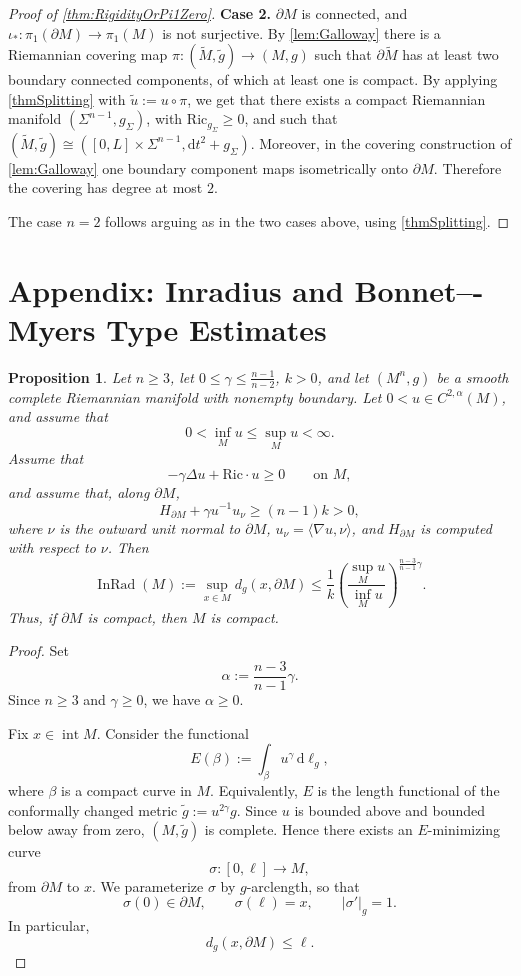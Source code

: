 \documentclass[12pt,a4paper,reqno]{amsart}
\newtheorem{proposition}{Proposition}
\theoremstyle{definition}
\renewcommand{\leq}{\leqslant}
\renewcommand{\geq}{\geqslant}
\renewcommand{\tilde}{\widetilde}
\begin{document}
{\begin{proof}[Proof of \cref{thm:RigidityOrPi1Zero}]
    \textbf{Case 2.} $\partial M$ is connected, and $\iota_*:\pi_1(\partial M)\to\pi_1(M)$ is not surjective. By \cref{lem:Galloway} there is a Riemannian covering map $\pi:(\tilde M,\tilde g)\to (M,g)$ such that $\partial\tilde M$ has at least two boundary connected components, of which at least one is compact. By applying \cref{thmSplitting} with $\tilde u:=u\circ\pi$, we get that there exists a compact Riemannian manifold $(\Sigma^{n-1},g_\Sigma)$, with $\mathrm{Ric}_{g_\Sigma}\geq 0$, and such that $(\tilde M,\tilde g)\cong ([0,L]\times\Sigma^{n-1},\mathrm{d}t^2+g_{\Sigma})$. Moreover, in the covering construction of \cref{lem:Galloway} one boundary component maps
isometrically onto $\partial M$. Therefore the covering has degree at most $2$.

    The case $n=2$ follows arguing as in the two cases above, using \cref{thmSplitting}.
\end{proof}

\section{Appendix: Inradius and Bonnet–-Myers Type Estimates}\label{sec:app}
\begin{proposition}\label{prop:WeightedInradius}
Let \(n\geq 3\), let \(0\leq \gamma\leq \frac{n-1}{n-2}\), $k>0$, and let
\((M^n,g)\) be a smooth complete Riemannian manifold with nonempty boundary.
Let \(0<u\in C^{2,\alpha}(M)\), and assume that
\[
0<\inf_M u\leq \sup_M u<\infty .
\]
Assume that
\[
-\gamma\Delta u+\mathrm{Ric}\cdot u\geq 0
\qquad\text{on }M,
\]
and assume that, along \(\partial M\),
\[
H_{\partial M}+\gamma u^{-1}u_\nu\geq (n-1)k>0,
\]
where \(\nu\) is the outward unit normal to \(\partial M\),
\(u_\nu=\langle \nabla u,\nu\rangle\), and \(H_{\partial M}\) is computed
with respect to \(\nu\). Then
\[
\operatorname{InRad}(M):=\sup_{x\in M}d_g(x,\partial M)
\leq
\frac1k
\left(
\frac{\sup_M u}{\inf_M u}
\right)^{\frac{n-3}{n-1}\gamma}.
\]
Thus, if \(\partial M\) is compact, then \(M\) is compact.
\end{proposition}

\begin{proof}
Set
\[
\alpha:=\frac{n-3}{n-1}\gamma.
\]
Since $n\geq 3$ and $\gamma\geq 0$, we have $\alpha\geq 0$.

Fix $x\in \operatorname{int}M$. Consider the functional
\[
E(\beta):=\int_\beta u^\gamma\,\mathrm{d}\ell_g,
\]
where $\beta$ is a compact curve in $M$.
Equivalently, $E$ is the length functional of the conformally changed metric $
\widetilde g:=u^{2\gamma}g$.
Since \(u\) is bounded above and bounded below away from zero,
$(M,\widetilde g)$ is complete. Hence there exists an $E$-minimizing curve
\[
\sigma:[0,\ell]\to M,
\]
from $\partial M$ to $x$. We parameterize $\sigma$ by $g$-arclength, so that
\[
\sigma(0)\in \partial M,\qquad \sigma(\ell)=x,
\qquad |\sigma'|_g=1.
\]
In particular,
\[
d_g(x,\partial M)\leq \ell.
\]


\end{proof}}
\end{document}
